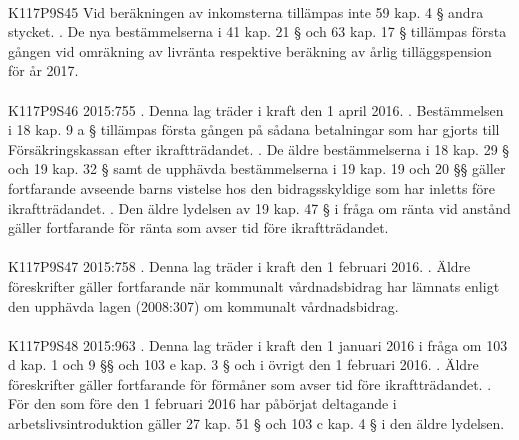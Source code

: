 \documentclass[a4paper,notitlepage,openany,10pt]{book}
\begin{document}
\paragraph*{}
{\tiny K117P9S45}
Vid beräkningen av inkomsterna tillämpas inte 59 kap. 4 § andra stycket.
. De nya bestämmelserna i 41 kap. 21 § och 63 kap. 17 § tillämpas första gången vid omräkning av livränta respektive beräkning av årlig tilläggspension för år 2017.
\paragraph*{}
{\tiny K117P9S46}
2015:755
. Denna lag träder i kraft den 1 april 2016.
. Bestämmelsen i 18 kap. 9 a § tillämpas första gången på sådana betalningar som har gjorts till Försäkringskassan efter ikraftträdandet.
. De äldre bestämmelserna i 18 kap. 29 § och 19 kap. 32 § samt de upphävda bestämmelserna i 19 kap. 19 och 20 §§ gäller fortfarande avseende barns vistelse hos den bidragsskyldige som har inletts före ikraftträdandet.
. Den äldre lydelsen av 19 kap. 47 § i fråga om ränta vid anstånd gäller fortfarande för ränta som avser tid före ikraftträdandet.
\paragraph*{}
{\tiny K117P9S47}
2015:758
. Denna lag träder i kraft den 1 februari 2016.
. Äldre föreskrifter gäller fortfarande när kommunalt vårdnadsbidrag har lämnats enligt den upphävda lagen (2008:307) om kommunalt vårdnadsbidrag.
\paragraph*{}
{\tiny K117P9S48}
2015:963
. Denna lag träder i kraft den 1 januari 2016 i fråga om 103 d kap. 1 och 9 §§ och 103 e kap. 3 § och i övrigt den 1 februari 2016.
. Äldre föreskrifter gäller fortfarande för förmåner som avser tid före ikraftträdandet.
. För den som före den 1 februari 2016 har påbörjat deltagande i arbetslivsintroduktion gäller 27 kap. 51 § och 103 c kap. 4 § i den äldre lydelsen.
\end{document}
